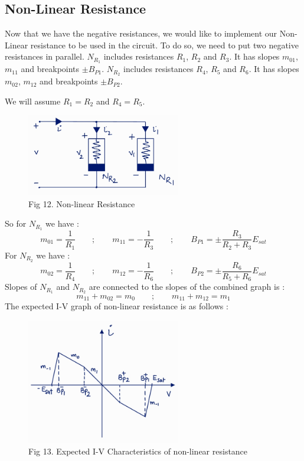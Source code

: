 \documentclass[12pt]{article}
\begin{document}
\subsection{Non-Linear Resistance}
Now that we have the negative resistances, we would like to implement our Non-Linear resistance to be used in the circuit. To do so, we need to put two negative resistances in parallel. \linebreak
$N_{R_1}$ includes resistances $R_1$, $R_2$ and $R_3$. It has slopes $m_{01}$, $m_{11}$ and breakpoints $\pm B_{P1}$. \linebreak
$N_{R_2}$ includes resistances $R_4$, $R_5$ and $R_6$. It has slopes $m_{02}$, $m_{12}$ and breakpoints $\pm B_{P2}$. \linebreak

We will assume $R_1=R_2$ and $R_4=R_5$. 
\begin{figure}[H]
	\centering
	\includegraphics[width=0.6\textwidth]{Images/fig12_nonlinear.png}
	\caption{Fig 12. Non-linear Resistance}
\end{figure}
So for $N_{R_1}$ we have :
\begin{equation}
	m_{01}=\dfrac{1}{R_1} \qquad ; \qquad m_{11}=-\dfrac{1}{R_3} \qquad ; \qquad B_{P1}=\pm \dfrac{R_3}{R_2+R_3}E_{sat} \label{eq:28}
\end{equation}
For $N_{R_2}$ we have :
\begin{equation}
	m_{02}=\dfrac{1}{R_4} \qquad ; \qquad m_{12}= -\dfrac{1}{R_6} \qquad ; \qquad B_{P2}= \pm \dfrac{R_6}{R_5+R_6}E_{sat} \label{eq:29} 
\end{equation}
Slopes of $N_{R_1}$ and $N_{R_2}$ are connected to the slopes of the combined graph is :
\begin{equation}
	m_{11}+m_{02}=m_0 \qquad ; \qquad m_{11}+m_{12}=m_1 \label{eq:30}
\end{equation}
The expected I-V graph of non-linear resistance is as follows :
\begin{figure}[H]
	\centering
	\includegraphics[width=0.6\textwidth]{Images/fig13_nonlinear characteristics.png}
	\caption{Fig 13. Expected I-V Characteristics of non-linear resistance}
\end{figure}
\end{document}
